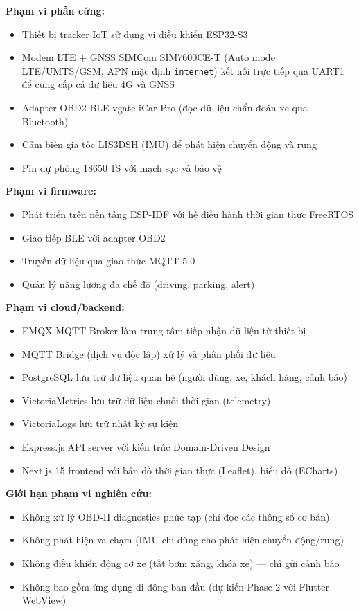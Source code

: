 \documentclass[13pt,a4paper]{extarticle}
\renewcommand{\\}{\thesislongtableorignewline\hline}%
\providecommand{\tightlist}{%
  \setlength{\itemsep}{0pt}\setlength{\parskip}{0pt}}
\begin{document}
\textbf{Phạm vi phần cứng:}

\begin{itemize}
\tightlist
\item
  Thiết bị tracker IoT sử dụng vi điều khiển ESP32-S3
\item
  Modem LTE + GNSS SIMCom SIM7600CE-T (Auto mode LTE/UMTS/GSM, APN mặc
  định \texttt{internet}) kết nối trực tiếp qua UART1 để cung cấp cả dữ
  liệu 4G và GNSS
\item
  Adapter OBD2 BLE vgate iCar Pro (đọc dữ liệu chẩn đoán xe qua
  Bluetooth)
\item
  Cảm biến gia tốc LIS3DSH (IMU) để phát hiện chuyển động và rung
\item
  Pin dự phòng 18650 1S với mạch sạc và bảo vệ
\end{itemize}

\textbf{Phạm vi firmware:}

\begin{itemize}
\tightlist
\item
  Phát triển trên nền tảng ESP-IDF với hệ điều hành thời gian thực
  FreeRTOS
\item
  Giao tiếp BLE với adapter OBD2
\item
  Truyền dữ liệu qua giao thức MQTT 5.0
\item
  Quản lý năng lượng đa chế độ (driving, parking, alert)
\end{itemize}

\textbf{Phạm vi cloud/backend:}

\begin{itemize}
\tightlist
\item
  EMQX MQTT Broker làm trung tâm tiếp nhận dữ liệu từ thiết bị
\item
  MQTT Bridge (dịch vụ độc lập) xử lý và phân phối dữ liệu
\item
  PostgreSQL lưu trữ dữ liệu quan hệ (người dùng, xe, khách hàng, cảnh
  báo)
\item
  VictoriaMetrics lưu trữ dữ liệu chuỗi thời gian (telemetry)
\item
  VictoriaLogs lưu trữ nhật ký sự kiện
\item
  Express.js API server với kiến trúc Domain-Driven Design
\item
  Next.js 15 frontend với bản đồ thời gian thực (Leaflet), biểu đồ
  (ECharts)
\end{itemize}

\textbf{Giới hạn phạm vi nghiên cứu:}

\begin{itemize}
\tightlist
\item
  Không xử lý OBD-II diagnostics phức tạp (chỉ đọc các thông số cơ bản)
\item
  Không phát hiện va chạm (IMU chỉ dùng cho phát hiện chuyển động/rung)
\item
  Không điều khiển động cơ xe (tắt bơm xăng, khóa xe) --- chỉ gửi cảnh
  báo
\item
  Không bao gồm ứng dụng di động ban đầu (dự kiến Phase 2 với Flutter
  WebView)
\end{itemize}
\end{document}
